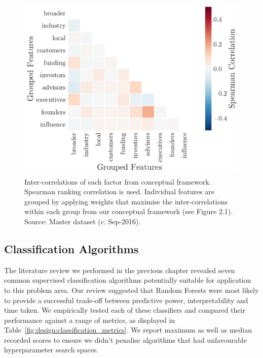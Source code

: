 \documentclass[../thesis/thesis.tex]{subfiles}
\begin{document}
\begin{figure}[!htb]
    \centering
    \includegraphics[width=\textwidth]{../figures/design/grouped_heatmap}
    \caption[Inter-correlations of factors from framework]{Inter-correlations of each factor from conceptual framework. Spearman ranking correlation is used. Individual features are grouped by applying weights that maximise the inter-correlations within each group from our conceptual framework (see Figure 2.1). Source: Master dataset (c. Sep-2016).}
    \label{fig:design:grouped_heatmap}
\end{figure}

\subsection{Classification Algorithms}

The literature review we performed in the previous chapter revealed seven common supervised classification algorithms potentially suitable for application to this problem area. Our review suggested that Random Forests were most likely to provide a successful trade-off between predictive power, interpretability and time taken. We empirically tested each of these classifiers and compared their performance against a range of metrics, as displayed in Table~\ref{fig:design:classification_metrics}. We report maximum as well as median recorded scores to ensure we didn't penalise algorithms that had unfavourable hyperparameter search spaces.

\begin{table}[!htb]
    \centering
    \scalebox{0.8}{}
    \caption[Overview of classification algorithm performance]{}
    \label{fig:design:classification_metrics}
\end{table}
\end{document}
